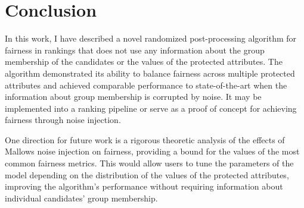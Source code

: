 \chapter{Conclusion}
\label{conclusion}

In this work, I have described a novel randomized post-processing algorithm for fairness in rankings that does not use any information about the group membership of the candidates or the values of the protected attributes. The algorithm demonstrated its ability to balance fairness across multiple protected attributes and achieved comparable performance to state-of-the-art when the information about group membership is corrupted by noise. It may be implemented into a ranking pipeline or serve as a proof of concept for achieving fairness through noise injection.

One direction for future work is a rigorous theoretic analysis of the effects of Mallows noise injection on fairness, providing a bound for the values of the most common fairness metrics. This would allow users to tune the parameters of the model depending on the distribution of the values of the protected attributes, improving the algorithm's performance without requiring information about individual candidates' group membership.